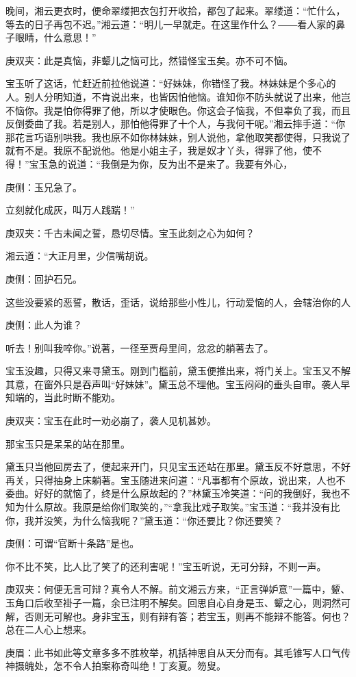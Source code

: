 \begin{parag}
    晚间，湘云更衣时，便命翠缕把衣包打开收拾，都包了起来。翠缕道：“忙什么，等去的日子再包不迟。”湘云道：“明儿一早就走。在这里作什么？――看人家的鼻子眼睛，什么意思！”\begin{note}庚双夹：此是真恼，非颦儿之恼可比，然错怪宝玉矣。亦不可不恼。\end{note}宝玉听了这话，忙赶近前拉他说道：“好妹妹，你错怪了我。林妹妹是个多心的人。别人分明知道，不肯说出来，也皆因怕他恼。谁知你不防头就说了出来，他岂不恼你。我是怕你得罪了他，所以才使眼色。你这会子恼我，不但辜负了我，而且反倒委曲了我。若是别人，那怕他得罪了十个人，与我何干呢。”湘云摔手道：“你那花言巧语别哄我。我也原不如你林妹妹，别人说他，拿他取笑都使得，只我说了就有不是。我原不配说他。他是小姐主子，我是奴才丫头，得罪了他，使不得！”宝玉急的说道：“我倒是为你，反为出不是来了。我要有外心，\begin{note}庚侧：玉兄急了。\end{note}立刻就化成灰，叫万人践踹！”\begin{note}庚双夹：千古未闻之誓，恳切尽情。宝玉此刻之心为如何？\end{note}湘云道：“大正月里，少信嘴胡说。\begin{note}庚侧：回护石兄。\end{note}这些没要紧的恶誓，散话，歪话，说给那些小性儿，行动爱恼的人，会辖治你的人\begin{note}庚侧：此人为谁？\end{note}听去！别叫我啐你。”说著，一径至贾母里间，忿忿的躺著去了。
\end{parag}


\begin{parag}
    宝玉没趣，只得又来寻黛玉。刚到门槛前，黛玉便推出来，将门关上。宝玉又不解其意，在窗外只是吞声叫“好妹妹”。黛玉总不理他。宝玉闷闷的垂头自审。袭人早知端的，当此时断不能劝。\begin{note}庚双夹：宝玉在此时一劝必崩了，袭人见机甚妙。\end{note}那宝玉只是呆呆的站在那里。
\end{parag}


\begin{parag}
    黛玉只当他回房去了，便起来开门，只见宝玉还站在那里。黛玉反不好意思，不好再关，只得抽身上床躺著。宝玉随进来问道：“凡事都有个原故，说出来，人也不委曲。好好的就恼了，终是什么原故起的？”林黛玉冷笑道：“问的我倒好，我也不知为什么原故。我原是给你们取笑的，”“拿我比戏子取笑。”宝玉道：“我并没有比你，我并没笑，为什么恼我呢？”黛玉道：“你还要比？你还要笑？\begin{note}庚侧：可谓“官断十条路”是也。\end{note}你不比不笑，比人比了笑了的还利害呢！”宝玉听说，无可分辩，不则一声。\begin{note}庚双夹：何便无言可辩？真令人不解。前文湘云方来，“正言弹妒意”一篇中，颦、玉角口后收至褂子一篇，余已注明不解矣。回思自心自身是玉、颦之心，则洞然可解，否则无可解也。身非宝玉，则有辩有答；若宝玉，则再不能辩不能答。何也？总在二人心上想来。\end{note}\begin{note}庚眉：此书如此等文章多多不胜枚举，机括神思自从天分而有。其毛锥写人口气传神摄魄处，怎不令人拍案称奇叫绝！丁亥夏。笏叟。\end{note}
\end{parag}


